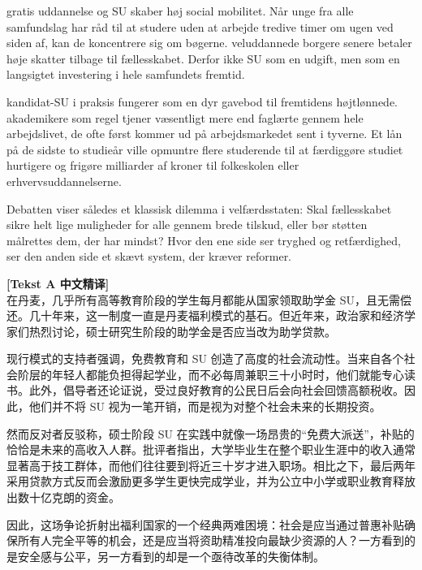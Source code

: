  gratis uddannelse og SU skaber høj social mobilitet. Når unge fra alle samfundslag har råd til at studere uden at arbejde tredive timer om ugen ved siden af, kan de koncentrere sig om bøgerne.  veluddannede borgere senere betaler høje skatter tilbage til fællesskabet. Derfor  ikke SU som en udgift, men som en langsigtet investering i hele samfundets fremtid.

 kandidat-SU i praksis fungerer som en dyr gavebod til fremtidens højtlønnede.  akademikere som regel tjener væsentligt mere end faglærte gennem hele arbejdslivet,  de ofte først kommer ud på arbejdsmarkedet sent i tyverne. Et lån på de sidste to studieår ville  opmuntre flere studerende til at færdiggøre studiet hurtigere og frigøre milliarder af kroner til folkeskolen eller erhvervsuddannelserne.

Debatten viser således et klassisk dilemma i velfærdsstaten: Skal fællesskabet sikre helt lige muligheder for alle gennem brede tilskud, eller bør støtten målrettes dem, der har mindst? Hvor den ene side ser tryghed og retfærdighed, ser den anden side et skævt system, der kræver reformer.

\begin{transbox}
\small
\textbf{\color{NCDTeal}[Tekst A 中文精译]}\\
在丹麦，几乎所有高等教育阶段的学生每月都能从国家领取助学金 SU，且无需偿还。几十年来，这一制度一直是丹麦福利模式的基石。但近年来，政治家和经济学家们热烈讨论，硕士研究生阶段的助学金是否应当改为助学贷款。

现行模式的支持者强调，免费教育和 SU 创造了高度的社会流动性。当来自各个社会阶层的年轻人都能负担得起学业，而不必每周兼职三十小时时，他们就能专心读书。此外，倡导者还论证说，受过良好教育的公民日后会向社会回馈高额税收。因此，他们并不将 SU 视为一笔开销，而是视为对整个社会未来的长期投资。

然而反对者反驳称，硕士阶段 SU 在实践中就像一场昂贵的“免费大派送”，补贴的恰恰是未来的高收入人群。批评者指出，大学毕业生在整个职业生涯中的收入通常显著高于技工群体，而他们往往要到将近三十岁才进入职场。相比之下，最后两年采用贷款方式反而会激励更多学生更快完成学业，并为公立中小学或职业教育释放出数十亿克朗的资金。

因此，这场争论折射出福利国家的一个经典两难困境：社会是应当通过普惠补贴确保所有人完全平等的机会，还是应当将资助精准投向最缺少资源的人？一方看到的是安全感与公平，另一方看到的却是一个亟待改革的失衡体制。
\end{transbox}


